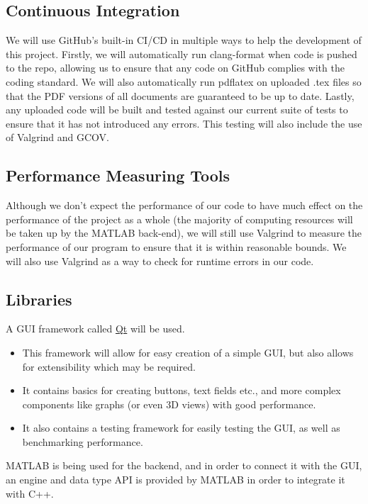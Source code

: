 \documentclass{article}
\begin{document}
\subsection{Continuous Integration}
We will use GitHub's built-in CI/CD in multiple ways to help the development of this project. Firstly, we will automatically run clang-format when code is pushed to the repo, allowing us to ensure that any code on GitHub complies with the coding standard.
We will also automatically run pdflatex on uploaded .tex files so that the PDF versions of all documents are guaranteed to be up to date. Lastly, any uploaded code will be built and tested against our current suite of tests to ensure that it has not introduced any errors.
This testing will also include the use of Valgrind and GCOV.

\subsection{Performance Measuring Tools}
Although we don't expect the performance of our code to have much effect on the performance of the project as a whole (the majority of computing resources will be taken up by the MATLAB back-end), we will still use Valgrind to measure the performance of our program to ensure that
it is within reasonable bounds. We will also use Valgrind as a way to check for runtime errors in our code.

\subsection{Libraries}
A GUI framework called \href{https://www.qt.io/}{Qt} will be used.
\begin{itemize}
	\item This framework will allow for easy creation of a simple GUI, but also allows for extensibility which may be required.
	\item It contains basics for creating buttons, text fields etc., and more complex components like graphs (or even 3D views) with good performance.
	\item It also contains a testing framework for easily testing the GUI, as well as benchmarking performance.
\end{itemize}
MATLAB is being used for the backend, and in order to connect it with the GUI, an engine and data type API is 
provided by MATLAB in order to integrate it with C++.
\end{document}
